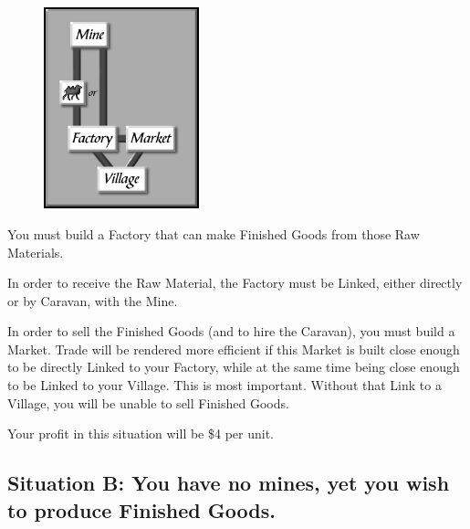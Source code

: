 \begin{figure}
	\vspace{-20pt}
	\begin{center}
		\includegraphics[width=0.4\textwidth]{Itradesit1}
	\end{center}
	\vspace{-20pt}
\end{figure}

You must build a Factory that can make Finished Goods from those Raw Materials.

In order to receive the Raw Material, the Factory must be Linked, either directly or
by Caravan, with the Mine.

In order to sell the Finished Goods (and to hire the Caravan), you must build a Market. Trade will be rendered more efficient if this Market is built close enough to be directly Linked to your Factory, while at the same time being close enough to be Linked to your Village. This is most important. Without that Link to a Village, you will be unable to sell Finished Goods.

Your profit in this situation will be \$4 per unit.

\subsection{Situation B: You have no mines, yet you wish to produce Finished Goods.}

